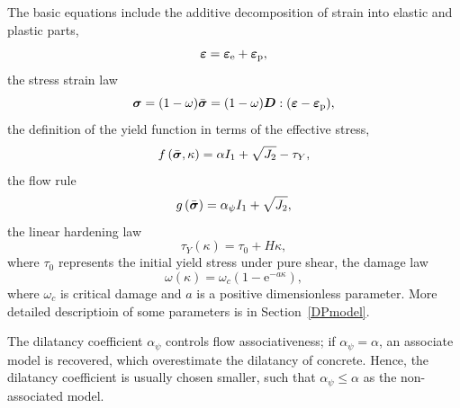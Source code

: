\documentclass[a4paper]{article}
\newcommand{\mbf}[1]{\mbox{\boldmath$#1$}}
\newcommand{\alphaPsi}{\alpha_{\psi}}
\newcommand{\veps}{\mbf{\varepsilon}}  %
\newcommand{\vsig}{\mbf{\sigma}}%
\begin{document}
The basic equations include the additive decomposition of strain into elastic and plastic parts,
\begin{equation}
\veps = \veps_{\rm{e}} + \veps_{\rm{p}},
\end{equation}
the stress strain law 
\begin{equation}
\vsig = (1-\omega)\bar{\vsig}=(1-\omega)\mbf{D} :(\veps-\veps_{\rm{p}}),
\end{equation}
the definition of the yield function in terms of the effective stress,
\begin{equation}
f \left(\bar{\vsig},\kappa \right) = \alpha I_1 + \sqrt{J_2} - \tau_Y,
\end{equation}
the flow rule
\begin{equation}
g \left( \bar{\vsig} \right) = \alphaPsi I_1 + \sqrt{J_2},
\end{equation}
the linear hardening law
\begin{equation}
\tau_Y(\kappa) = \tau_0 + H\kappa,
\end{equation}
where $\tau_0$ represents the initial yield stress under pure shear,
the damage law
\begin{equation}
\label{damagelawDP}
\omega(\kappa) = \omega_c(1-\mbox{e}^{-a\kappa}),
\end{equation}
where $\omega_c$ is critical damage and $a$ is a positive dimensionless parameter.
More detailed descriptioin of some parameters is in Section~\ref{DPmodel}.

The dilatancy coefficient $\alphaPsi$ controls flow associativeness; if $\alphaPsi=\alpha$, an associate model is recovered, which
overestimate the dilatancy of concrete. Hence, the dilatancy coefficient is usually chosen smaller, such that $\alphaPsi \leq \alpha$ as the non-associated model.

% 
\end{document}
